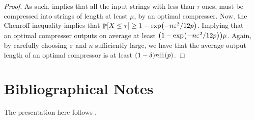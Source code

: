 \begin{proof}
    As such,  implies that all the input strings
    with less than $\tau$ ones, must be compressed into strings of
    length at least $\mu$, by an optimal compresser. Now, the Chenroff
    inequality implies that $\Prob{X \leq \tau } \geq 1- \exp \pth{ -
       n \eps^2 /12p } $. Implying that an optimal compresser outputs
    on average at least $\pth{1- \exp \pth{ - n \eps^2 /12p } }
    \mu$. Again, by carefully choosing ${\varepsilon}$ and $n$ sufficiently
    large, we have that the average output length of an optimal
    compressor is at least $(1-\delta)n \Entropy{p}$.
\end{proof}



\section{Bibliographical Notes}

The presentation here follows \cite[Sec. 9.1-Sec 9.3]{mu-pcrap-05}.


\ChapterEnd{}

%
